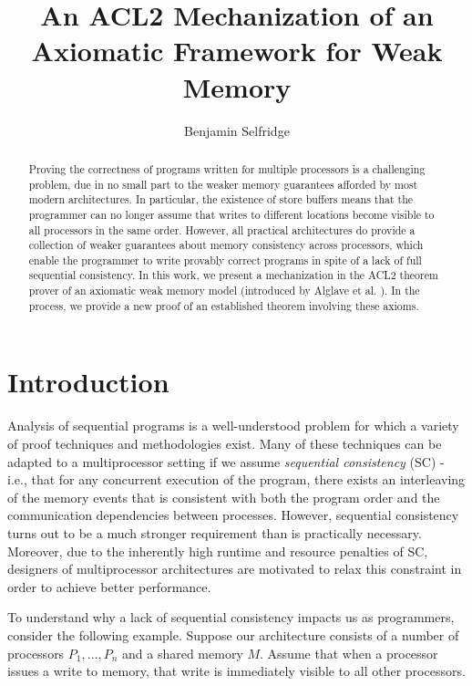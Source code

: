\documentclass[]{eptcs}
\title{An ACL2 Mechanization of an Axiomatic Framework for Weak Memory}
\author{Benjamin Selfridge
\institute{University of Texas at Austin\\ Austin, TX}
\email{benself@cs.utexas.edu}
}
\begin{document}
\maketitle

\begin{abstract}Proving the correctness of programs written for multiple processors is a challenging problem, due in no small part to the weaker memory guarantees afforded by most modern architectures. In particular, the existence of store buffers means that the programmer can no longer assume that writes to different locations become visible to all processors in the same order. However, all practical architectures do provide a collection of weaker guarantees about memory consistency across processors, which enable the programmer to write provably correct programs in spite of a lack of full sequential consistency. In this work, we present a mechanization in the ACL2 theorem prover of an axiomatic weak memory model (introduced by Alglave et al. \cite{alglave_cats}). In the process, we provide a new proof of an established theorem involving these axioms.
\end{abstract}

\section{Introduction}

Analysis of sequential programs is a well-understood problem for which a variety of proof techniques and methodologies exist. \cite{hoare69} Many of these techniques can be adapted to a multiprocessor setting if we assume \emph{sequential consistency} (SC) - i.e., that for any concurrent execution of the program, there exists an interleaving of the memory events that is consistent with both the program order and the communication dependencies between processes. \cite{lamport79, owicki76} However, sequential consistency turns out to be a much stronger requirement than is practically necessary. Moreover, due to the inherently high runtime and resource penalties of SC, designers of multiprocessor architectures are motivated to relax this constraint in order to achieve better performance.

To understand why a lack of sequential consistency impacts us as programmers, consider the following example. Suppose our architecture consists of a number of processors $P_1, \ldots, P_n$ and a shared memory $M$. Assume that when a processor issues a write to memory, that write is immediately visible to all other processors. 
\end{document}
